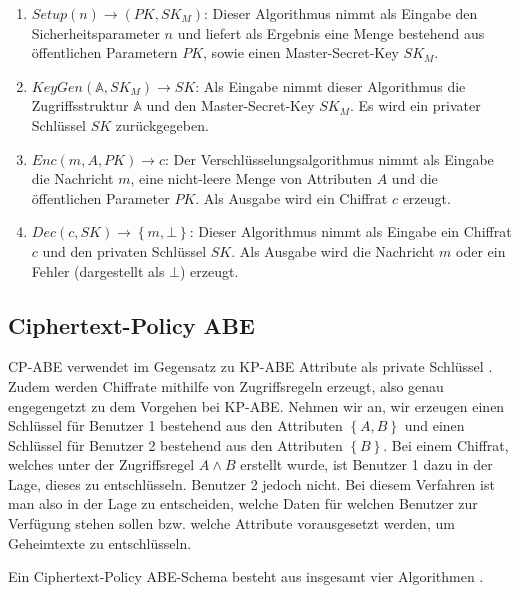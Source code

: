 \begin{enumerate}
	\item $\textit{Setup}\left(n\right) \to \left(PK, SK_M\right)$: Dieser
		Algorithmus nimmt als Eingabe den Sicherheitsparameter $n$ und liefert als
		Ergebnis eine Menge bestehend aus öffentlichen Parametern $PK$, sowie
		einen Master-Secret-Key $SK_M$.
	\item $\textit{KeyGen}\left(\mathbb{A}, SK_M\right) \to SK$: Als Eingabe
		nimmt dieser Algorithmus die Zu\-griffs\-struktur $\mathbb{A}$ und den
		Master-Secret-Key $SK_M$. Es wird ein privater Schlüssel $SK$
		zurückgegeben.
	\item $Enc\left(m, A, PK\right) \to c$: Der Verschlüsselungsalgorithmus
		nimmt als Eingabe die Nachricht $m$, eine nicht-leere Menge von Attributen
		$A$ und die öffentlichen Parameter $PK$. Als Ausgabe wird ein Chiffrat $c$
		erzeugt.
	\item $Dec\left(c, SK\right) \to \left\{m, \bot\right\}$: Dieser Algorithmus
		nimmt als Eingabe ein Chiffrat $c$ und den privaten Schlüssel $SK$. Als
		Ausgabe wird die Nachricht $m$ oder ein Fehler (dargestellt als $\bot$)
		erzeugt.
\end{enumerate}

\subsection{Ciphertext-Policy ABE}
CP-ABE verwendet im Gegensatz zu KP-ABE Attribute als private Schlüssel
\cite{cp-abe-ieee}. Zudem werden Chiffrate mithilfe von Zugriffsregeln
erzeugt, also genau engegengetzt zu dem Vorgehen bei KP-ABE. Nehmen wir an,
wir erzeugen einen Schlüssel für Benutzer 1 bestehend aus den Attributen
$\left\{A, B\right\}$ und einen Schlüssel für Benutzer 2 bestehend aus den
Attributen $\left\{B\right\}$. Bei einem Chiffrat, welches unter der
Zugriffsregel $A \land B$ erstellt wurde, ist Benutzer 1 dazu in der Lage,
dieses zu entschlüsseln.  Benutzer 2 jedoch nicht. Bei diesem Verfahren ist
man also in der Lage zu entscheiden, welche Daten für welchen Benutzer zur
Verfügung stehen sollen bzw. welche Attribute vorausgesetzt werden, um Geheimtexte
zu entschlüsseln.

Ein Ciphertext-Policy ABE-Schema besteht aus insgesamt vier Algorithmen
\cite{cp-abe}.


